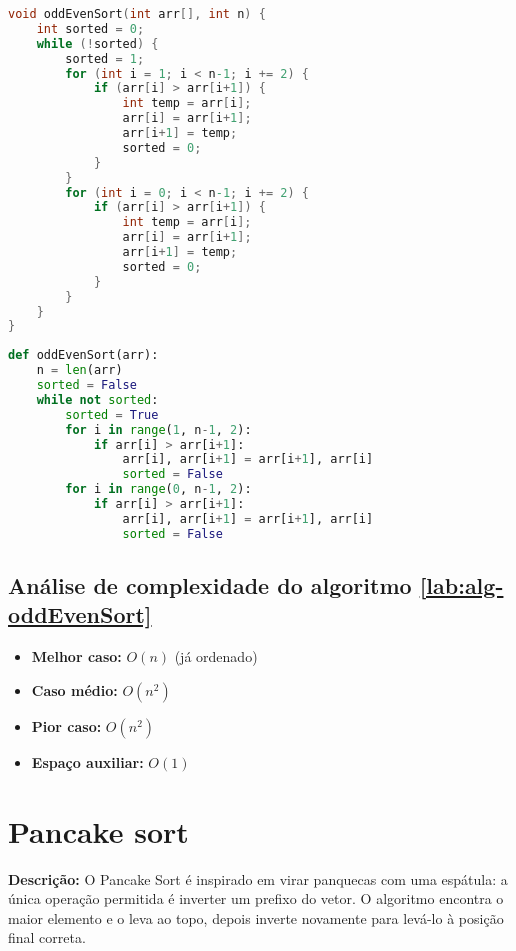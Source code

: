 \begin{lstlisting}[language=C,caption={Odd-Even sort em C},captionpos=t]
void oddEvenSort(int arr[], int n) {
    int sorted = 0;
    while (!sorted) {
        sorted = 1;
        for (int i = 1; i < n-1; i += 2) {
            if (arr[i] > arr[i+1]) {
                int temp = arr[i];
                arr[i] = arr[i+1];
                arr[i+1] = temp;
                sorted = 0;
            }
        }
        for (int i = 0; i < n-1; i += 2) {
            if (arr[i] > arr[i+1]) {
                int temp = arr[i];
                arr[i] = arr[i+1];
                arr[i+1] = temp;
                sorted = 0;
            }
        }
    }
}
\end{lstlisting}

\begin{lstlisting}[language=python,caption={Odd-Even sort em Python},captionpos=t]
def oddEvenSort(arr):
    n = len(arr)
    sorted = False
    while not sorted:
        sorted = True
        for i in range(1, n-1, 2):
            if arr[i] > arr[i+1]:
                arr[i], arr[i+1] = arr[i+1], arr[i]
                sorted = False
        for i in range(0, n-1, 2):
            if arr[i] > arr[i+1]:
                arr[i], arr[i+1] = arr[i+1], arr[i]
                sorted = False
\end{lstlisting}

\subsection{Análise de complexidade do algoritmo \ref{lab:alg-oddEvenSort}}
\begin{itemize}
    \item \textbf{Melhor caso:} $O(n)$ (já ordenado)
    \item \textbf{Caso médio:} $O(n^2)$
    \item \textbf{Pior caso:} $O(n^2)$
    \item \textbf{Espaço auxiliar:} $O(1)$
\end{itemize}


\section{Pancake sort}
\textbf{Descrição:} O Pancake Sort é inspirado em virar panquecas com uma espátula: a única operação permitida é inverter um prefixo do vetor. O algoritmo encontra o maior elemento e o leva ao topo, depois inverte novamente para levá-lo à posição final correta.

